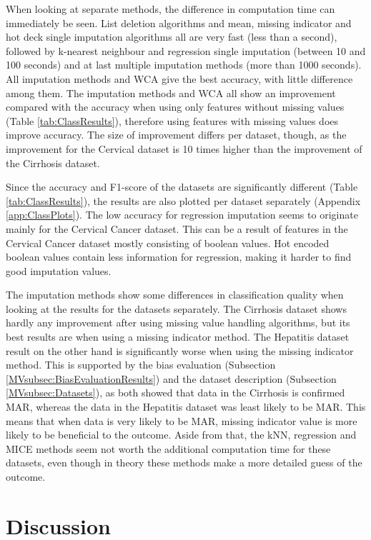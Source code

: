 \documentclass[10pt,a4paper]{report}
\begin{document}
	When looking at separate methods, the difference in computation time can immediately be seen. List deletion algorithms and mean, missing indicator and hot deck single imputation algorithms all are very fast (less than a second), followed by k-nearest neighbour and regression single imputation (between 10 and 100 seconds) and at last multiple imputation methods (more than 1000 seconds). All imputation methods and WCA give the best accuracy, with little difference among them. The imputation methods and WCA all show an improvement compared with the accuracy when using only features without missing values (Table \ref{tab:ClassResults}), therefore using features with missing values does improve accuracy. The size of improvement differs per dataset, though, as the improvement for the Cervical dataset is 10 times higher than the improvement of the Cirrhosis dataset. 
	
	Since the accuracy and F1-score of the datasets are significantly different (Table \ref{tab:ClassResults}), the results are also plotted per dataset separately (Appendix \ref{app:ClassPlots}). The low accuracy for regression imputation seems to originate mainly for the Cervical Cancer dataset. This can be a result of features in the Cervical Cancer dataset mostly consisting of boolean values. Hot encoded boolean values contain less information for regression, making it harder to find good imputation values. 
	
	The imputation methods show some differences in classification quality when looking at the results for the datasets separately. The Cirrhosis dataset shows hardly any improvement after using missing value handling algorithms, but its best results are when using a missing indicator method. The Hepatitis dataset result on the other hand is significantly worse when using the missing indicator method. This is supported by the bias evaluation (Subsection \ref{MVsubsec:BiasEvaluationResults}) and the dataset description (Subsection \ref{MVsubsec:Datasets}), as both showed that data in the Cirrhosis is confirmed MAR, whereas the data in the Hepatitis dataset was least likely to be MAR. This means that when data is very likely to be MAR, missing indicator value is more likely to be beneficial to the outcome. Aside from that, the kNN, regression and MICE methods seem not worth the additional computation time for these datasets, even though in theory these methods make a more detailed guess of the outcome. 
	
	\section{Discussion}
	\label{MVsec:Discussion}
	
\end{document}
